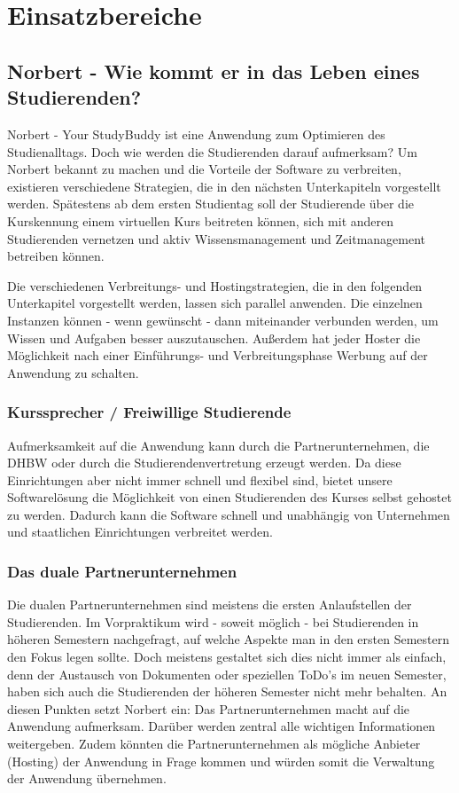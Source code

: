 
\chapter{Einsatzbereiche}
\section{Norbert - Wie kommt er in das Leben eines Studierenden?}
Norbert - Your StudyBuddy ist eine Anwendung zum Optimieren des Studienalltags. Doch wie werden die Studierenden darauf aufmerksam?
Um Norbert bekannt zu machen und die Vorteile der Software zu verbreiten, existieren verschiedene Strategien, die in den nächsten Unterkapiteln vorgestellt werden. Spätestens ab dem ersten Studientag soll der Studierende über die Kurskennung einem virtuellen Kurs beitreten können, sich mit anderen Studierenden vernetzen und aktiv Wissensmanagement und Zeitmanagement betreiben können.

Die verschiedenen Verbreitungs- und Hostingstrategien, die in den folgenden Unterkapitel vorgestellt werden, lassen sich parallel anwenden. Die einzelnen Instanzen können - wenn gewünscht - dann miteinander  verbunden werden, um Wissen und Aufgaben besser auszutauschen. Außerdem hat jeder Hoster die Möglichkeit nach einer Einführungs- und Verbreitungsphase Werbung auf der Anwendung zu schalten.

\subsection{Kurssprecher / Freiwillige Studierende}
Aufmerksamkeit auf die Anwendung kann durch die Partnerunternehmen, die DHBW oder durch die Studierendenvertretung erzeugt werden. Da diese Einrichtungen aber nicht immer schnell und flexibel sind, bietet unsere Softwarelösung die Möglichkeit von einen Studierenden des Kurses selbst gehostet zu werden. Dadurch kann die Software schnell und unabhängig von Unternehmen und staatlichen Einrichtungen verbreitet werden. 

\subsection{Das duale Partnerunternehmen}
Die dualen Partnerunternehmen sind meistens die ersten Anlaufstellen der Studierenden. Im Vorpraktikum wird  - soweit möglich - bei Studierenden in höheren Semestern nachgefragt, auf welche Aspekte man in den ersten Semestern den Fokus legen sollte. Doch meistens gestaltet sich dies nicht immer als einfach, denn der Austausch von Dokumenten oder speziellen ToDo's im neuen Semester, haben sich auch die Studierenden der höheren Semester nicht mehr behalten. An diesen Punkten setzt Norbert ein: Das Partnerunternehmen macht auf die Anwendung aufmerksam. Darüber werden zentral alle wichtigen Informationen weitergeben. Zudem könnten die Partnerunternehmen als mögliche Anbieter (Hosting) der Anwendung in Frage kommen und würden somit die Verwaltung der Anwendung übernehmen.

